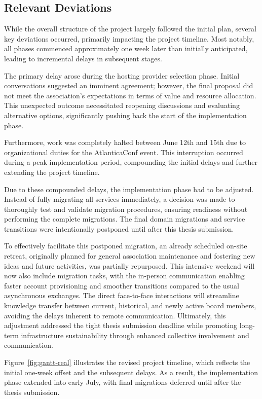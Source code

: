 \subsection*{Relevant Deviations}

While the overall structure of the project largely followed the initial plan, several key deviations occurred, primarily impacting the project timeline. Most notably, all phases commenced approximately one week later than initially anticipated, leading to incremental delays in subsequent stages.

The primary delay arose during the hosting provider selection phase. Initial conversations suggested an imminent agreement; however, the final proposal did not meet the association's expectations in terms of value and resource allocation. This unexpected outcome necessitated reopening discussions and evaluating alternative options, significantly pushing back the start of the implementation phase.

Furthermore, work was completely halted between June 12th and 15th due to organizational duties for the AtlanticaConf event. This interruption occurred during a peak implementation period, compounding the initial delays and further extending the project timeline.

Due to these compounded delays, the implementation phase had to be adjusted. Instead of fully migrating all services immediately, a decision was made to thoroughly test and validate migration procedures, ensuring readiness without performing the complete migrations. The final domain migrations and service transitions were intentionally postponed until after this thesis submission.

To effectively facilitate this postponed migration, an already scheduled on-site retreat, originally planned for general association maintenance and fostering new ideas and future activities, was partially repurposed. This intensive weekend will now also include migration tasks, with the in-person communication enabling faster account provisioning and smoother transitions compared to the usual asynchronous exchanges. The direct face-to-face interactions will streamline knowledge transfer between current, historical, and newly active board members, avoiding the delays inherent to remote communication. Ultimately, this adjustment addressed the tight thesis submission deadline while promoting long-term infrastructure sustainability through enhanced collective involvement and communication.

Figure~\ref{fig:gantt-real} illustrates the revised project timeline, which reflects the initial one-week offset and the subsequent delays. As a result, the implementation phase extended into early July, with final migrations deferred until after the thesis submission.

